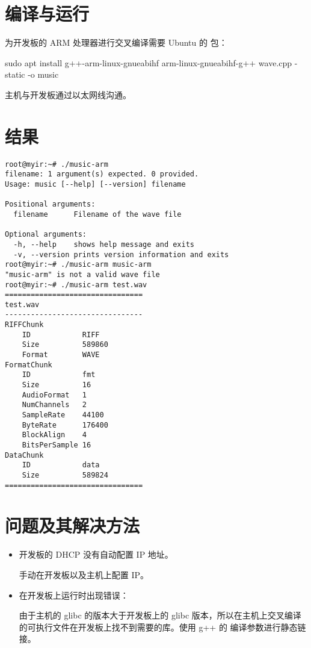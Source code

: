 \section{编译与运行}

为开发板的 ARM 处理器进行交叉编译需要 Ubuntu 的  包：

\begin{codeblock}
sudo apt install g++-arm-linux-gnueabihf
arm-linux-gnueabihf-g++ wave.cpp -static -o music
\end{codeblock}

主机与开发板通过以太网线沟通。

\newpage

\section{结果}



\begin{verbatim}
root@myir:~# ./music-arm 
filename: 1 argument(s) expected. 0 provided.
Usage: music [--help] [--version] filename

Positional arguments:
  filename      Filename of the wave file

Optional arguments:
  -h, --help    shows help message and exits
  -v, --version prints version information and exits
root@myir:~# ./music-arm music-arm 
"music-arm" is not a valid wave file
root@myir:~# ./music-arm test.wav 
================================
test.wav
--------------------------------
RIFFChunk
    ID            RIFF
    Size          589860
    Format        WAVE
FormatChunk
    ID            fmt
    Size          16
    AudioFormat   1
    NumChannels   2
    SampleRate    44100
    ByteRate      176400
    BlockAlign    4
    BitsPerSample 16
DataChunk
    ID            data
    Size          589824
================================
\end{verbatim}


\section{问题及其解决方法}

\begin{itemize}
    \item 开发板的 DHCP 没有自动配置 IP 地址。
    
    手动在开发板以及主机上配置 IP。

    \item 在开发板上运行时出现错误：
    
    
    由于主机的 glibc 的版本大于开发板上的 glibc 版本，所以在主机上交叉编译的可执行文件在开发板上找不到需要的库。使用 g++ 的  编译参数进行静态链接。
\end{itemize}